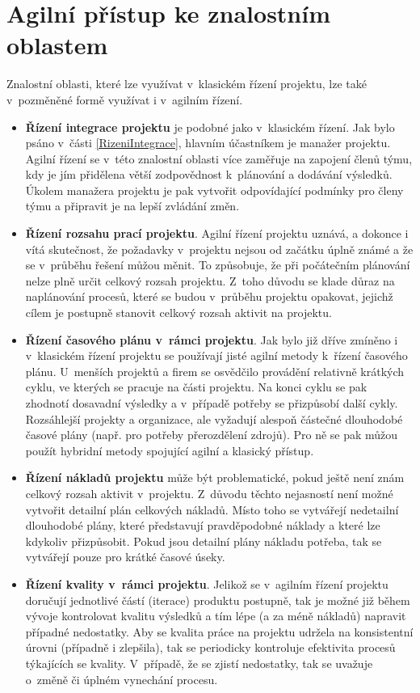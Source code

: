 \section{Agilní přístup ke znalostním oblastem}
Znalostní oblasti, které lze využívat v~klasickém řízení projektu, lze také v~pozměněné formě využívat i v~agilním řízení. 

\begin{itemize}
    \item \textbf{Řízení integrace projektu} je podobné jako v~klasickém řízení. Jak bylo psáno v~části \ref{RizeniIntegrace}, hlavním účastníkem je manažer projektu. Agilní řízení se v~této znalostní oblasti více zaměřuje na zapojení členů týmu, kdy je jím přidělena větší zodpovědnost k~plánování a dodávání výsledků. Úkolem manažera projektu je pak vytvořit odpovídající podmínky pro členy týmu a připravit je na lepší zvládání změn.
    \item \textbf{Řízení rozsahu prací projektu}. Agilní řízení projektu uznává, a dokonce i vítá skutečnost, že požadavky v~projektu nejsou od začátku úplně známé a že se v~průběhu řešení můžou měnit. To způsobuje, že při počátečním plánování nelze plně určit celkový rozsah projektu. Z~toho důvodu se klade důraz na naplánování procesů, které se budou v~průběhu projektu opakovat, jejichž cílem je postupně stanovit celkový rozsah aktivit na projektu.
    \item \textbf{Řízení časového plánu v~rámci projektu}. Jak bylo již dříve zmíněno i v~klasickém řízení projektu se používají jisté agilní metody k~řízení časového plánu. U~menších projektů a firem se osvědčilo provádění relativně krátkých cyklu, ve kterých se pracuje na části projektu. Na konci cyklu se pak zhodnotí dosavadní výsledky a v~případě potřeby se přizpůsobí další cykly. Rozsáhlejší projekty a organizace, ale vyžadují alespoň částečné dlouhodobé časové plány (např. pro potřeby přerozdělení zdrojů). Pro ně se pak můžou použít hybridní metody spojující agilní a klasický přístup. 
    \item \textbf{Řízení nákladů projektu} může být problematické, pokud ještě není znám celkový rozsah aktivit v~projektu. Z~důvodu těchto nejasností není možné vytvořit detailní plán celkových nákladů. Místo toho se vytvářejí nedetailní dlouhodobé plány, které představují pravděpodobné náklady a které lze kdykoliv přizpůsobit. Pokud jsou detailní plány nákladu potřeba, tak se vytvářejí pouze pro krátké časové úseky.
    \item \textbf{Řízení kvality v~rámci projektu}. Jelikož se v~agilním řízení projektu doručují jednotlivé částí (iterace) produktu postupně, tak je možné již během vývoje kontrolovat kvalitu výsledků a tím lépe (a za méně nákladů) napravit případné nedostatky. Aby se kvalita práce na projektu udržela na konsistentní úrovni (případně i zlepšila), tak se periodicky kontroluje efektivita procesů týkajících se kvality. V~případě, že se zjistí nedostatky, tak se uvažuje o~změně či úplném vynechání procesu.

\end{itemize}
